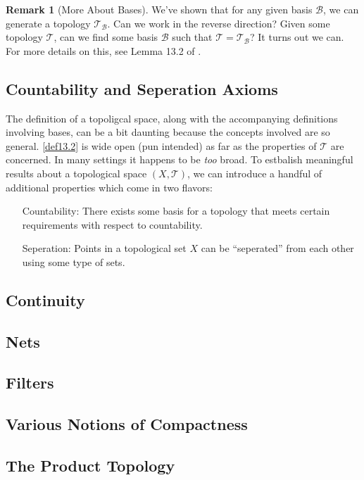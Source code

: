 \documentclass{article}
\newcommand{\T}{\mathcal{T}}
\theoremstyle{definition}
\newtheorem{remark}{Remark}[section]
\begin{document}
	\begin{remark}[More About Bases]
		We've shown that for any given basis $\mathscr B$, we can generate a topology $\T_{\mathscr B}$. Can we work in the reverse direction? Given some topology $\T$, can we find some basis $\mathscr{B}$ such that $\T = \T_{\mathscr B}$? It turns out we can. For more details on this, see Lemma 13.2 of \cite{munk2}.
	\end{remark}

		
	\subsection{Countability and Seperation Axioms}
	The definition of a topoligcal space, along with the accompanying definitions involving bases, can be a bit daunting because the concepts involved are so general. \cref{def13.2} is wide open (pun intended) as far as the properties of $\T$ are concerned. In many settings it happens to be \textit{too} broad. To estbalish meaningful results about a topological space $(X,\T)$, we can introduce a handful of additional properties which come in two flavors:
	
	\begin{enumerate}
		\item [Countability:] There exists some basis for a topology that meets certain requirements with respect to countability.  
		\item [Seperation:] Points in a topological set $X$ can be ``seperated'' from each other using some type of sets. 
	\end{enumerate}

	\subsection{Continuity}
	\subsection{Nets}
	\subsection{Filters}
	\subsection{Various Notions of Compactness}
	\subsection{The Product Topology}
\end{document}
